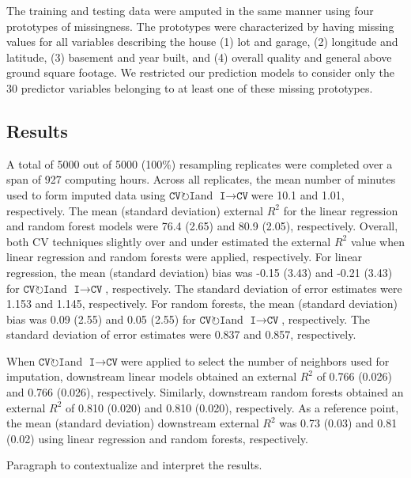 \documentclass[AMA,STIX1COL,doublespace]{WileyNJD-v2}
\begin{document}
The training and testing data were amputed in the same manner using four
prototypes of missingness. The prototypes were characterized by having
missing values for all variables describing the house (1) lot and
garage, (2) longitude and latitude, (3) basement and year built, and (4)
overall quality and general above ground square footage. We restricted
our prediction models to consider only the 30 predictor variables
belonging to at least one of these missing prototypes.

\subsection{Results}

A total of 5000 out of 5000 (100\%) resampling replicates were completed
over a span of 927 computing hours. Across all replicates, the mean
number of minutes used to form imputed data using
$\texttt{CV}\!\circlearrowright\!\texttt{I}$\space and
$\texttt{I}\!\!\rightarrow\!\texttt{CV}$\space were 10.1 and 1.01,
respectively. The mean (standard deviation) external \(R^2\) for the
linear regression and random forest models were 76.4 (2.65) and 80.9
(2.05), respectively. Overall, both CV techniques slightly over and
under estimated the external \(R^2\) value when linear regression and
random forests were applied, respectively. For linear regression, the
mean (standard deviation) bias was -0.15 (3.43) and -0.21 (3.43) for
$\texttt{CV}\!\circlearrowright\!\texttt{I}$\space and
$\texttt{I}\!\!\rightarrow\!\texttt{CV}$, respectively. The standard
deviation of error estimates were 1.153 and 1.145, respectively. For
random forests, the mean (standard deviation) bias was 0.09 (2.55) and
0.05 (2.55) for $\texttt{CV}\!\circlearrowright\!\texttt{I}$\space and
$\texttt{I}\!\!\rightarrow\!\texttt{CV}$, respectively. The standard
deviation of error estimates were 0.837 and 0.857, respectively.

When $\texttt{CV}\!\circlearrowright\!\texttt{I}$\space and
$\texttt{I}\!\!\rightarrow\!\texttt{CV}$\space were applied to select
the number of neighbors used for imputation, downstream linear models
obtained an external \(R^2\) of 0.766 (0.026) and 0.766 (0.026),
respectively. Similarly, downstream random forests obtained an external
\(R^2\) of 0.810 (0.020) and 0.810 (0.020), respectively. As a reference
point, the mean (standard deviation) downstream external \(R^2\) was
0.73 (0.03) and 0.81 (0.02) using linear regression and random forests,
respectively.

Paragraph to contextualize and interpret the results.
\end{document}
